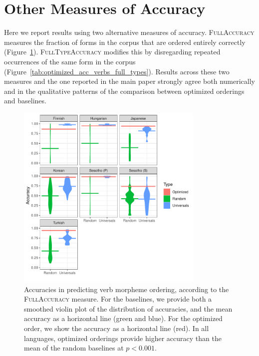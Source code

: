 \documentclass[11pt,letterpaper]{article}
\begin{document}
\section{Other Measures of Accuracy}

Here we report results using two alternative measures of accuracy.
\textsc{FullAccuracy} measures the fraction of forms in the corpus that are ordered entirely correctly (Figure~\ref{tab:optimized_acc_verbs_full}).
\textsc{FullTypeAccuracy} modifies this by disregarding repeated occurrences of the same form in the corpus (Figure~\ref{tab:optimized_acc_verbs_full_types}).
Results across these two measures and the one reported in the main paper strongly agree both numerically and in the qualitative patterns of the comparison between optimized orderings and baselines.

%
%
%
\begin{figure}[]
    \centering
\includegraphics[width=0.8\textwidth]{figures/accuracies_verbs_full.pdf}
    \caption{Accuracies in predicting verb morpheme ordering, according to the \textsc{FullAccuracy} measure.
    For the baselines, we provide both a smoothed violin plot of the distribution of accuracies, and the mean accuracy as a horizontal line (green and blue). For the optimized order, we show the accuracy as a horizontal line (red).
    In all languages, optimized orderings provide higher accuracy than the mean of the random baselines at $p<0.001$.}
    \label{tab:optimized_acc_verbs_full}
\end{figure}
%
\end{document}

